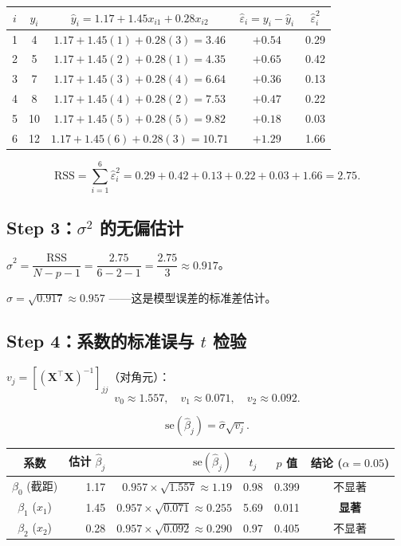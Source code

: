 \begin{center}
\renewcommand{\arraystretch}{1.2}
\begin{tabular}{c|c|c|c|c}
\toprule
$i$ & $y_i$ & $\hat{y}_i = 1.17 + 1.45x_{i1} + 0.28x_{i2}$ & $\hat{\varepsilon}_i = y_i - \hat{y}_i$ & $\hat{\varepsilon}_i^2$ \\
\midrule
1 & 4  & $1.17 + 1.45(1) + 0.28(3) = 3.46$  & $+0.54$ & 0.29 \\
2 & 5  & $1.17 + 1.45(2) + 0.28(1) = 4.35$  & $+0.65$ & 0.42 \\
3 & 7  & $1.17 + 1.45(3) + 0.28(4) = 6.64$  & $+0.36$ & 0.13 \\
4 & 8  & $1.17 + 1.45(4) + 0.28(2) = 7.53$  & $+0.47$ & 0.22 \\
5 & 10 & $1.17 + 1.45(5) + 0.28(5) = 9.82$  & $+0.18$ & 0.03 \\
6 & 12 & $1.17 + 1.45(6) + 0.28(3) = 10.71$ & $+1.29$ & 1.66 \\
\bottomrule
\end{tabular}
\end{center}

\[
    \mathrm{RSS} = \sum_{i=1}^{6} \hat{\varepsilon}_i^2 = 0.29 + 0.42 + 0.13 + 0.22 + 0.03 + 1.66 = 2.75.
\]

\subsection{Step 3：$\sigma^2$ 的无偏估计}

$\hat{\sigma}^2 = \dfrac{\mathrm{RSS}}{N - p - 1} = \dfrac{2.75}{6 - 2 - 1} = \dfrac{2.75}{3} \approx 0.917$。

$\hat{\sigma} = \sqrt{0.917} \approx 0.957$ ——这是模型误差的标准差估计。

\subsection{Step 4：系数的标准误与 $t$ 检验}

$v_j = [(\mathbf{X}^\top \mathbf{X})^{-1}]_{jj}$（对角元）：
\[
    v_0 \approx 1.557,\quad v_1 \approx 0.071,\quad v_2 \approx 0.092.
\]

\[
    \mathrm{se}(\hat{\beta}_j) = \hat{\sigma} \sqrt{v_j}.
\]

\begin{center}
\renewcommand{\arraystretch}{1.3}
\begin{tabular}{c|r|r|c|c|c}
\toprule
\textbf{系数} & \textbf{估计 $\hat{\beta}_j$} & \textbf{$\mathrm{se}(\hat{\beta}_j)$} & \textbf{$t_j$} & \textbf{$p$ 值}
    & \textbf{结论 ($\alpha=0.05$)} \\
\midrule
$\beta_0$ (截距) & 1.17 & $0.957 \times \sqrt{1.557} \approx 1.19$ & 0.98  & 0.399 & 不显著 \\
$\beta_1$ ($x_1$)  & 1.45 & $0.957 \times \sqrt{0.071} \approx 0.255$ & 5.69 & 0.011 & \textbf{显著} \\
$\beta_2$ ($x_2$)  & 0.28 & $0.957 \times \sqrt{0.092} \approx 0.290$ & 0.97  & 0.405 & 不显著 \\
\bottomrule
\end{tabular}
\end{center}

